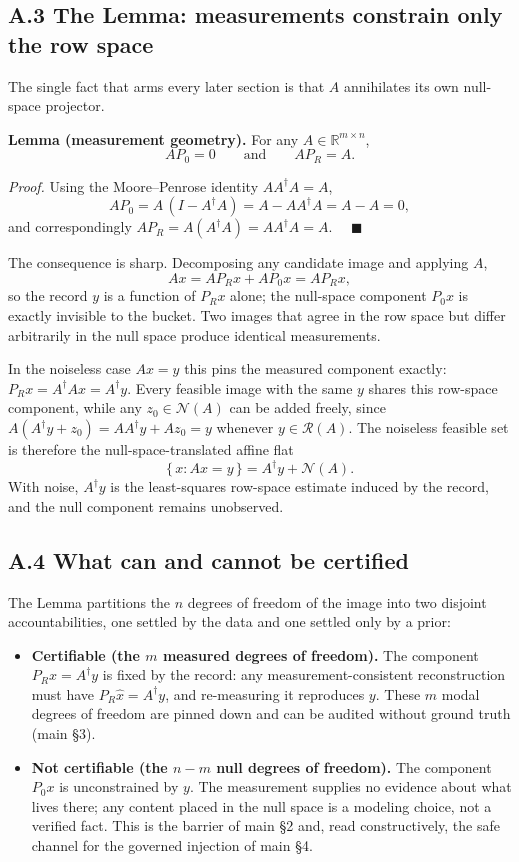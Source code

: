 \documentclass[11pt]{article}
\begin{document}
\subsection*{A.3 The Lemma: measurements constrain only the row space}

The single fact that arms every later section is that $A$ annihilates its own null-space projector.

\textbf{Lemma (measurement geometry).} For any $A \in \mathbb{R}^{m \times n}$,
$$A P_0 = 0 \qquad\text{and}\qquad A P_R = A .$$

\textit{Proof.} Using the Moore--Penrose identity $A A^\dagger A = A$,
$$A P_0 = A\,(I - A^\dagger A) = A - A A^\dagger A = A - A = 0,$$
and correspondingly $A P_R = A(A^\dagger A) = A A^\dagger A = A$. $\quad\blacksquare$

The consequence is sharp. Decomposing any candidate image and applying $A$,
$$A x = A P_R x + A P_0 x = A P_R x ,$$
so the record $y$ is a function of $P_R x$ alone; the null-space component $P_0 x$ is exactly invisible to the bucket. Two images that agree in the row space but differ arbitrarily in the null space produce identical measurements.

In the noiseless case $A x = y$ this pins the measured component exactly: $P_R x = A^\dagger A x = A^\dagger y$. Every feasible image with the same $y$ shares this row-space component, while any $z_0 \in \mathcal{N}(A)$ can be added freely, since $A(A^\dagger y + z_0) = A A^\dagger y + A z_0 = y$ whenever $y \in \mathcal{R}(A)$. The noiseless feasible set is therefore the null-space-translated affine flat
$$\{\, x : A x = y \,\} = A^\dagger y + \mathcal{N}(A) .$$
With noise, $A^\dagger y$ is the least-squares row-space estimate induced by the record, and the null component remains unobserved.

\subsection*{A.4 What can and cannot be certified}

The Lemma partitions the $n$ degrees of freedom of the image into two disjoint accountabilities, one settled by the data and one settled only by a prior:

\begin{itemize}
\item \textbf{Certifiable (the $m$ measured degrees of freedom).} The component $P_R x = A^\dagger y$ is fixed by the record: any measurement-consistent reconstruction must have $P_R \hat{x} = A^\dagger y$, and re-measuring it reproduces $y$. These $m$ modal degrees of freedom are pinned down and can be audited without ground truth (main §3).
\item \textbf{Not certifiable (the $n - m$ null degrees of freedom).} The component $P_0 x$ is unconstrained by $y$. The measurement supplies no evidence about what lives there; any content placed in the null space is a modeling choice, not a verified fact. This is the barrier of main §2 and, read constructively, the safe channel for the governed injection of main §4.
\end{itemize}
\end{document}
